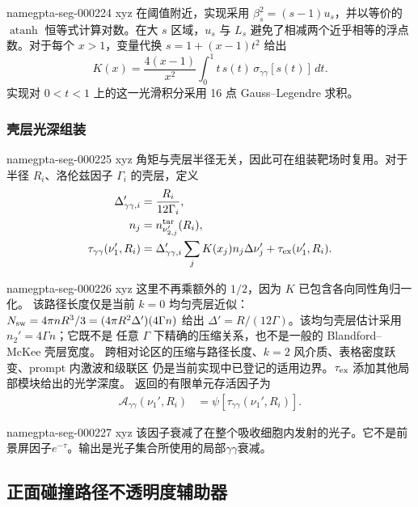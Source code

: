\documentclass[twocolumn]{aastex702}
\makeatletter
\providecommand{\gptareaderanchor}[1]{\pdfdest name{#1} xyz}%
\providecommand{\gptareaderanchor}[1]{\special{pdf:dest (#1) [ @thispage /XYZ @xpos @ypos null ]}}%
\makeatother
\begin{document}
\gptareaderanchor{gpta-seg-000224}%
在阈值附近，实现采用 \(\beta_s^2=(s-1)u_s\)，并以等价的
\(\operatorname{atanh}\) 恒等式计算对数。在大 \(s\) 区域，\(u_s\) 与 \(L_s\)
避免了相减两个近乎相等的浮点数。对于每个 \(x>1\)，变量代换
\(s=1+(x-1)t^2\) 给出
\begin{equation}
K(x)=\frac{4(x-1)}{x^2}\int_0^1
t\,s(t)\,\sigma_{\gamma\gamma}[s(t)]\,dt .
\end{equation}
实现对 \(0<t<1\) 上的这一光滑积分采用 16 点 Gauss--Legendre 求积。

\subsubsection{壳层光深组装}


\gptareaderanchor{gpta-seg-000225}%
角矩与壳层半径无关，因此可在组装靶场时复用。对于半径 \(R_i\)、洛伦兹因子
\(\Gamma_i\) 的壳层，定义
\begin{equation}
\begin{aligned}
\Delta'_{\gamma\gamma,i}&=\frac{R_i}{12\Gamma_i},\\
n_j&=n_{\nu_{2,j}'}^{\rm tar}(R_i),\\
\tau_{\gamma\gamma}(\nu_1',R_i)
&=\Delta'_{\gamma\gamma,i}
\sum_j K(x_j)n_j\Delta\nu_j'
+\tau_{\rm ex}(\nu_1',R_i).
\end{aligned}
\end{equation}

\gptareaderanchor{gpta-seg-000226}%
这里不再乘额外的 \(1/2\)，因为 \(K\) 已包含各向同性角归一化。
该路径长度仅是当前 \(k=0\) 均匀壳层近似：
\(N_{\rm sw}=4\pi nR^3/3=(4\pi R^2\Delta')(4\Gamma n)\) 给出
\(\Delta'=R/(12\Gamma)\)。该均匀壳层估计采用 \(n_2'=4\Gamma n\)；它既不是
任意 \(\Gamma\) 下精确的压缩关系，也不是一般的 Blandford--McKee 壳层宽度。
跨相对论区的压缩与路径长度、\(k=2\) 风介质、表格密度跃变、prompt 内激波和级联区
仍是当前实现中已登记的适用边界。\(\tau_{\rm ex}\) 添加其他局部模块给出的光学深度。
返回的有限单元存活因子为
\begin{equation}
\begin{aligned}
\mathcal{A}_{\gamma\gamma}(\nu_1',R_i)
&=\psi[\tau_{\gamma\gamma}(\nu_1',R_i)] .
\end{aligned}
\end{equation}

\gptareaderanchor{gpta-seg-000227}%
该因子衰减了在整个吸收细胞内发射的光子。它不是前景屏因子\(e^{-\tau}\)。输出是光子集合所使用的局部\(\gamma\gamma\)衰减\citep{GouldSchreder1967,Svensson1987}。

\subsection{正面碰撞路径不透明度辅助器}
\end{document}
